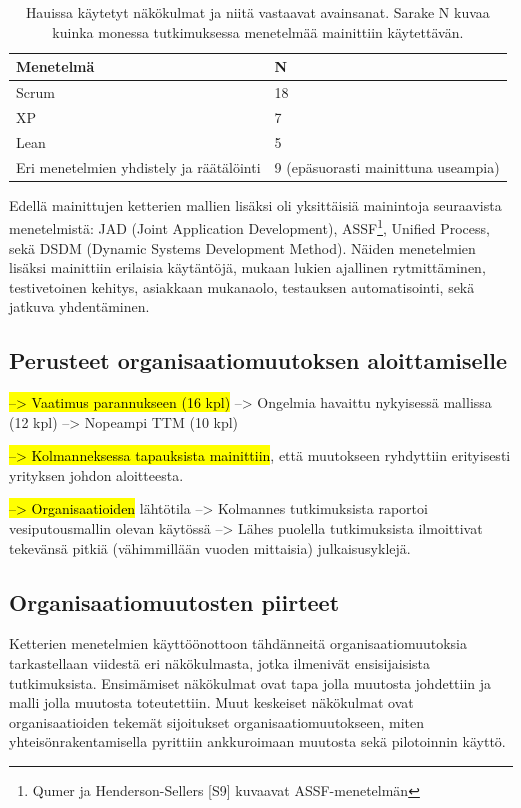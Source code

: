 \begin{table}[h]
    \begin{tabular}{ll}
        \toprule
        Menetelmä       & N   \\ \midrule
        Scrum           & 18 \\ 
        XP              & 7 \\
        Lean            & 5 \\
        Eri menetelmien yhdistely ja räätälöinti & 9  (epäsuorasti mainittuna useampia) \\
        \bottomrule
    \end{tabular}
	\caption{Hauissa käytetyt näkökulmat ja niitä vastaavat avainsanat. Sarake N
	kuvaa kuinka monessa tutkimuksessa menetelmää mainittiin käytettävän.}
	\label{table:practices}
\end{table}

Edellä mainittujen ketterien mallien lisäksi oli yksittäisiä mainintoja
seuraavista menetelmistä: JAD (Joint Application Development),
ASSF\footnote{Qumer ja Henderson-Sellers [S9] kuvaavat ASSF-menetelmän}, Unified
Process, sekä DSDM (Dynamic Systems Development Method). Näiden menetelmien
lisäksi mainittiin erilaisia käytäntöjä, mukaan lukien ajallinen rytmittäminen,
testivetoinen kehitys, asiakkaan mukanaolo, testauksen automatisointi, sekä
jatkuva yhdentäminen.

\subsection{Perusteet organisaatiomuutoksen aloittamiselle}

\hl{--> Vaatimus parannukseen (16 kpl)}
--> Ongelmia havaittu nykyisessä mallissa (12 kpl)
--> Nopeampi TTM (10 kpl)

\hl{--> Kolmanneksessa tapauksista mainittiin}, että muutokseen ryhdyttiin
erityisesti yrityksen johdon aloitteesta.

\hl{--> Organisaatioiden} lähtötila
--> Kolmannes tutkimuksista raportoi vesiputousmallin olevan käytössä
--> Lähes puolella tutkimuksista ilmoittivat tekevänsä pitkiä (vähimmillään
vuoden mittaisia) julkaisusyklejä.

\subsection{Organisaatiomuutosten piirteet}

Ketterien menetelmien käyttöönottoon tähdänneitä organisaatiomuutoksia
tarkastellaan viidestä eri näkökulmasta, jotka ilmenivät ensisijaisista
tutkimuksista. Ensimämiset näkökulmat ovat tapa jolla muutosta johdettiin ja
malli jolla muutosta toteutettiin. Muut keskeiset näkökulmat ovat
organisaatioiden tekemät sijoitukset organisaatiomuutokseen, miten
yhteisönrakentamisella pyrittiin ankkuroimaan muutosta sekä pilotoinnin käyttö.

